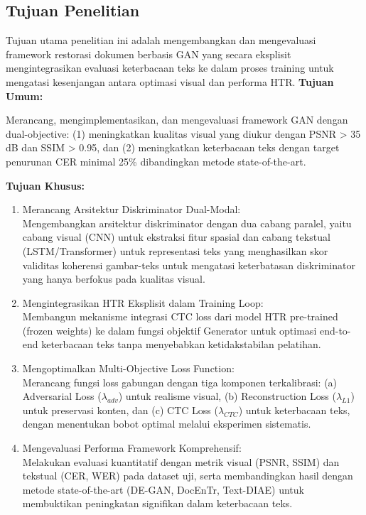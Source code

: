 \documentclass[12pt,a4paper]{article}
\begin{document}
\subsection{Tujuan Penelitian}
\label{subsec:tujuan-penelitian}

Tujuan utama penelitian ini adalah mengembangkan dan mengevaluasi framework restorasi dokumen berbasis GAN yang secara eksplisit mengintegrasikan evaluasi keterbacaan teks ke dalam proses training untuk mengatasi kesenjangan antara optimasi visual dan performa HTR.
\newpage
\textbf{Tujuan Umum:}

Merancang, mengimplementasikan, dan mengevaluasi framework GAN dengan dual-objective: (1) meningkatkan kualitas visual yang diukur dengan PSNR > 35 dB dan SSIM > 0.95, dan (2) meningkatkan keterbacaan teks dengan target penurunan CER minimal 25\% dibandingkan metode state-of-the-art.

\vspace{0.8em}
\textbf{Tujuan Khusus:}

\begin{enumerate}[label=\textbf{T\arabic*:}, leftmargin=1cm]
    \item Merancang Arsitektur Diskriminator Dual-Modal: \\
    Mengembangkan arsitektur diskriminator dengan dua cabang paralel, yaitu cabang visual (CNN) untuk ekstraksi fitur spasial dan cabang tekstual (LSTM/Transformer) untuk representasi teks yang menghasilkan skor validitas koherensi gambar-teks untuk mengatasi keterbatasan diskriminator yang hanya berfokus pada kualitas visual.

    \item Mengintegrasikan HTR Eksplisit dalam Training Loop: \\
    Membangun mekanisme integrasi CTC loss dari model HTR pre-trained (frozen weights) ke dalam fungsi objektif Generator untuk optimasi end-to-end keterbacaan teks tanpa menyebabkan ketidakstabilan pelatihan.

    \item Mengoptimalkan Multi-Objective Loss Function: \\
    Merancang fungsi loss gabungan dengan tiga komponen terkalibrasi: (a) Adversarial Loss ($\lambda_{adv}$) untuk realisme visual, (b) Reconstruction Loss ($\lambda_{L1}$) untuk preservasi konten, dan (c) CTC Loss ($\lambda_{CTC}$) untuk keterbacaan teks, dengan menentukan bobot optimal melalui eksperimen sistematis.

    \item Mengevaluasi Performa Framework Komprehensif: \\
    Melakukan evaluasi kuantitatif dengan metrik visual (PSNR, SSIM) dan tekstual (CER, WER) pada dataset uji, serta membandingkan hasil dengan metode state-of-the-art (DE-GAN, DocEnTr, Text-DIAE) untuk membuktikan peningkatan signifikan dalam keterbacaan teks.
\end{enumerate}
\end{document}
